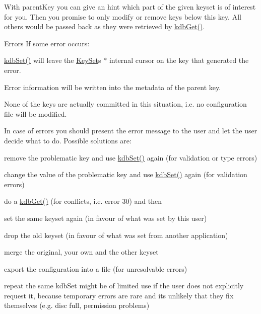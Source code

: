 With {\ttfamily parent\+Key} you can give an hint which part of the given keyset is of interest for you. Then you promise to only modify or remove keys below this key. All others would be passed back as they were retrieved by \hyperlink{group__kdb_ga28e385fd9cb7ccfe0b2f1ed2f62453a1}{kdb\+Get()}.

\begin{DoxyParagraph}{Errors}
If some error occurs\+:
\begin{DoxyItemize}
\item \hyperlink{group__kdb_ga11436b058408f83d303ca5e996832bcf}{kdb\+Set()} will leave the \hyperlink{classkdb_1_1KeySet}{Key\+Set}\textquotesingle{}s $\ast$ internal cursor on the key that generated the error.
\item Error information will be written into the metadata of the parent key.
\item None of the keys are actually committed in this situation, i.\+e. no configuration file will be modified.
\end{DoxyItemize}
\end{DoxyParagraph}
In case of errors you should present the error message to the user and let the user decide what to do. Possible solutions are\+:
\begin{DoxyItemize}
\item remove the problematic key and use \hyperlink{group__kdb_ga11436b058408f83d303ca5e996832bcf}{kdb\+Set()} again (for validation or type errors)
\item change the value of the problematic key and use \hyperlink{group__kdb_ga11436b058408f83d303ca5e996832bcf}{kdb\+Set()} again (for validation errors)
\item do a \hyperlink{group__kdb_ga28e385fd9cb7ccfe0b2f1ed2f62453a1}{kdb\+Get()} (for conflicts, i.\+e. error 30) and then
\begin{DoxyItemize}
\item set the same keyset again (in favour of what was set by this user)
\item drop the old keyset (in favour of what was set from another application)
\item merge the original, your own and the other keyset
\end{DoxyItemize}
\item export the configuration into a file (for unresolvable errors)
\item repeat the same kdb\+Set might be of limited use if the user does not explicitly request it, because temporary errors are rare and its unlikely that they fix themselves (e.\+g. disc full, permission problems)
\end{DoxyItemize}

